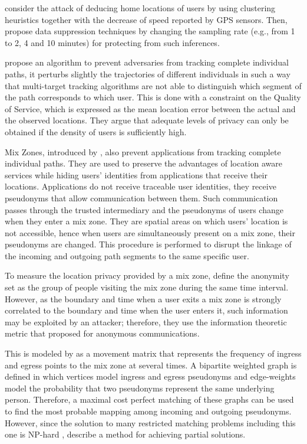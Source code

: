 \documentclass[times,twocolumn,final,authoryear]{elsarticle}
\begin{document}
\cite{Hoh06} consider the attack of deducing home locations of users by using clustering heuristics together with the decrease of speed reported by GPS sensors. Then, propose data suppression techniques by changing the sampling rate (e.g., from 1 to 2, 4 and 10 minutes) for protecting from such inferences.

\cite{Hoh2005} propose an algorithm to prevent adversaries from tracking complete individual paths, it 
perturbs slightly the trajectories of different individuals in such a way that multi-target tracking algorithms are not able to distinguish which segment of the path corresponds to which user.
This is done with a constraint on the Quality of Service, which is expressed as the mean location error between the actual and the observed locations. They argue that adequate levels of privacy can only be obtained if the density of users is sufficiently high.

{\color{blue} Mix Zones, introduced by \cite{Beresford2003}, also prevent applications from tracking complete individual paths. 
They are used to preserve the advantages of location aware services while hiding users' identities from applications that receive their locations.
Applications do not receive traceable user identities, they receive pseudonyms that allow communication between them. Such communication passes through the trusted intermediary and the pseudonyms of users change when they enter a mix zone.
They are spatial areas on which users' location is not accessible, hence when users are simultaneously present on a mix zone, their pseudonyms are changed. This procedure is performed to disrupt the linkage of the incoming and outgoing path segments to the same specific user.
}

To measure the location privacy provided by a mix zone, \cite{Beresford04mixzones} define the anonymity set as the group of people visiting the mix zone during the same time interval. However, as the boundary and time when a user exits a mix zone is strongly correlated to the boundary and time when the user enters it, such information may be exploited by an attacker; therefore, they use the information theoretic metric that \cite{Serjantov2002} proposed for anonymous communications. 

This is modeled by \cite{Beresford04mixzones} as a movement matrix that represents the frequency of ingress and egress points to the mix zone at several times.
A bipartite weighted graph is defined in which vertices model ingress and egress pseudonyms and edge-weights
model the probability that two pseudonyms represent the same underlying person. Therefore, a maximal cost perfect matching of these graphs can be used to find the most probable mapping among incoming and outgoing pseudonyms.  
However, since the solution to many restricted matching problems including this one is NP-hard \citep{Tanimoto1978}, \cite{Beresford04mixzones} describe a method for achieving partial solutions.
\end{document}
